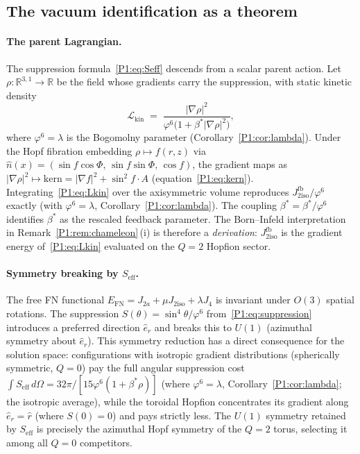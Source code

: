 \documentclass[11pt,a4paper]{article}
\theoremstyle{definition}
\theoremstyle{remark}
\newcommand{\vp}{\varphi}
\newcommand{\lam}{\lambda}
\newcommand{\bst}{\beta^{*}}
\newcommand{\Jfb}{J_{2\mathrm{iso}}^{\mathrm{fb}}}
\newcommand{\Ja}{J_{2a}}
\newcommand{\Jiso}{J_{2\mathrm{iso}}}
\newcommand{\Jfour}{J_{4}}
\begin{document}
\subsection{The vacuum identification as a theorem}
\label{P1:sec:vacuum_thm}
\paragraph{The parent Lagrangian.}
The suppression formula~\eqref{P1:eq:Seff} descends from a scalar parent action.
Let $\rho:\mathbb{R}^{3,1}\to\mathbb{R}$ be the field whose gradients carry
the suppression, with static kinetic density
\begin{equation}
  \mathcal{L}_{\mathrm{kin}}
  \;=\; \frac{|\nabla\rho|^2}{\vp^6\bigl(1+\bst|\nabla\rho|^2\bigr)},
  \label{P1:eq:Lkin}
\end{equation}
where $\vp^6=\lam$ is the Bogomolny parameter (Corollary~\ref{P1:cor:lambda}).
Under the Hopf fibration embedding
$\rho \mapsto f(r,z)$ via
$\hat{n}(x) = (\sin f\cos\Phi,\,\sin f\sin\Phi,\,\cos f)$,
the gradient maps as
$|\nabla\rho|^2 \mapsto \mathrm{kern} = |\nabla f|^2 + \sin^2\!f\cdot A$
(equation~\eqref{P1:eq:kern}).
Integrating~\eqref{P1:eq:Lkin} over the axisymmetric volume reproduces
$\Jfb/\vp^6$ exactly (with $\vp^6=\lam$, Corollary~\ref{P1:cor:lambda}).  The coupling $\bst = \beta^*/\vp^6$ identifies
$\bst$ as the rescaled feedback parameter.  The Born--Infeld
interpretation in Remark~\ref{P1:rem:chameleon}\,(i) is therefore a
\emph{derivation}: $\Jfb$ is the gradient energy of~\eqref{P1:eq:Lkin}
evaluated on the $Q=2$ Hopfion sector.

\paragraph{Symmetry breaking by $S_{\mathrm{eff}}$.}
The free FN functional $E_{\mathrm{FN}} = \Ja + \mu\Jiso + \lam\Jfour$
is invariant under $O(3)$ spatial rotations.  The suppression
$S(\theta) = \sin^4\!\theta/\vp^6$ from~\eqref{P1:eq:suppression}
introduces a preferred direction $\hat{e}_r$ and breaks this to
$U(1)$ (azimuthal symmetry about $\hat{e}_r$).  This symmetry
reduction has a direct consequence for the solution space:
configurations with isotropic gradient distributions (spherically
symmetric, $Q=0$) pay the full angular suppression cost
$\int S_{\mathrm{eff}}\,d\Omega = 32\pi/[15\vp^6(1+\bst\rho)]$
(where $\vp^6=\lam$, Corollary~\ref{P1:cor:lambda}; the isotropic average), while the toroidal Hopfion concentrates
its gradient along $\hat{e}_r = \hat{r}$ (where $S(0)=0$) and
pays strictly less.  The $U(1)$ symmetry retained by
$S_{\mathrm{eff}}$ is precisely the azimuthal Hopf symmetry of the
$Q=2$ torus, selecting it among all $Q=0$ competitors.
\end{document}
